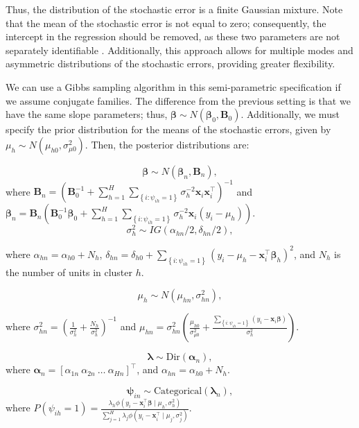 Thus, the distribution of the stochastic error is a finite Gaussian mixture. Note that the mean of the stochastic error is not equal to zero; consequently, the intercept in the regression should be removed, as these two parameters are not separately identifiable \cite{van2011bayesian}. Additionally, this approach allows for multiple modes and asymmetric distributions of the stochastic errors, providing greater flexibility.

We can use a Gibbs sampling algorithm in this semi-parametric specification if we assume conjugate families. The difference from the previous setting is that we have the same slope parameters; thus, $\boldsymbol{\beta} \sim N(\boldsymbol{\beta}_{0},\boldsymbol{B}_{0})$. Additionally, we must specify the prior distribution for the means of the stochastic errors, given by $\mu_h \sim N(\mu_{h0},\sigma^2_{\mu 0})$. Then, the posterior distributions are:

$$\boldsymbol{\beta}\sim N(\boldsymbol{\beta}_{n},\boldsymbol{B}_{n}),$$ where $\boldsymbol{B}_{n}=(\boldsymbol{B}_{0}^{-1}+\sum_{h=1}^H\sum_{\left\{i:  \psi_{ih}=1\right\}}\sigma_h^{-2}\boldsymbol{x}_i\boldsymbol{x}_i^{\top})^{-1}$ and $\boldsymbol{\beta}_{n}=\boldsymbol{B}_{n}(\boldsymbol{B}_{0}^{-1}\boldsymbol{\beta}_{0}+\sum_{h=1}^H\sum_{\left\{i:  \psi_{ih}=1\right\}}\sigma_h^{-2}\boldsymbol{x}_i(y_i-\mu_h))$.
$$\sigma_h^2\sim IG(\alpha_{hn}/2,\delta_{hn}/2),$$

where $\alpha_{hn}=\alpha_{h0}+N_h$, $\delta_{hn}=\delta_{h0}+\sum_{\left\{i:  \psi_{ih}=1\right\}}(y_i-\mu_h-\boldsymbol{x}_i^{\top}\boldsymbol{\beta}_h)^2$, and $N_h$ is the number of units in cluster $h$.

$$\mu_h\sim N(\mu_{hn},\sigma_{hn}^2),$$

where $\sigma_{hn}^2=\left(\frac{1}{\sigma_{h}^{2}}+\frac{N_h}{\sigma_{h}^2}\right)^{-1}$ and $\mu_{hn}=\sigma_{hn}^2\left(\frac{\mu_{h0}}{\sigma_{\mu0}^2}+\frac{\sum_{\left\{i:\psi_{ih}=1\right\}} (y_i-\boldsymbol{x}_i\boldsymbol{\beta})}{\sigma_h^2}\right)$.

$$\boldsymbol{\lambda}\sim \text{Dir}(\boldsymbol{\alpha}_n),$$   
where $\boldsymbol{\alpha}_n=[\alpha_{1n} \  \alpha_{2n} \ \dots \ \alpha_{Hn}]^{\top}$, and $\alpha_{hn}=\alpha_{h0}+N_h$.

$$\boldsymbol{\psi}_{in}\sim \text{Categorical}(\boldsymbol{\lambda}_n),$$
where $P(\psi_{ih}=1)=\frac{\lambda_{h}\phi(y_i-\boldsymbol{x}_i^{\top}\boldsymbol{\beta} \mid \mu_h,\sigma_h^2)}{\sum_{j=1}^H\lambda_{j}\phi(y_i-\boldsymbol{x}_i^{\top} \mid \mu_j,\sigma_j^2)}$.
 
